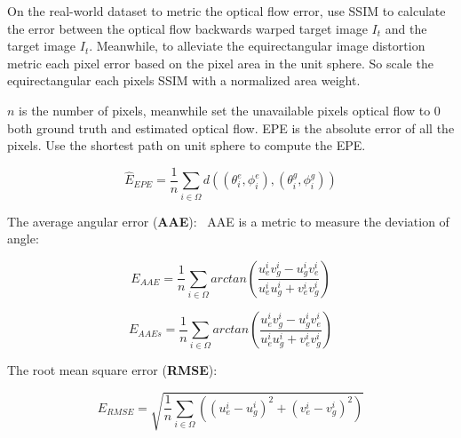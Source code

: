 On the real-world dataset to metric the optical flow error,  use SSIM to calculate the error between the optical flow backwards warped target image $I_t$ and the target image $I_t$.
Meanwhile, to alleviate the equirectangular image distortion metric each pixel error based on the pixel area in the unit sphere.
So scale the equirectangular each pixels SSIM with a normalized area weight.

$n$ is the number of pixels, meanwhile set the unavailable pixels optical flow to 0 both ground truth and estimated optical flow.
EPE is the absolute error of all the pixels.
Use the shortest path on unit sphere to compute the EPE.


\begin{equation}\label{equ:sec:exp:epe}
	\hat{E}_{EPE} = \frac{1}{n} \sum_{i \in \Omega} d\left( (\theta^e_i,\phi^e_i), (\theta^g_i,\phi^g_i)\right) 
\end{equation}

The average angular error (\textbf{AAE}):~\cite{??} 
AAE is a metric to measure the deviation of angle:

\begin{equation}\label{equ_exp_aae}
	E_{AAE} = \frac{1}{n} \sum_{i \in \Omega}arctan(\frac{u^i_e v^i_g - u^i_g v^i_e}{u^i_e u^i_g + v^i_e v^i_g})
\end{equation}

\begin{equation}\label{equ_exp_aae_sp}
	E_{AAEs} = \frac{1}{n} \sum_{i \in \Omega}arctan(\frac{u^i_e v^i_g - u^i_g v^i_e}{u^i_e u^i_g + v^i_e v^i_g})
\end{equation}

The root mean square error (\textbf{RMSE}):~\cite{??}


\begin{equation}\label{equ_exp_rmse}
	E_{RMSE} = \sqrt{\frac{1}{n} \sum_{i \in \Omega}((u_e^i - u_g^i)^2 + (v_e^i - v_g^i)^2)}
\end{equation}

